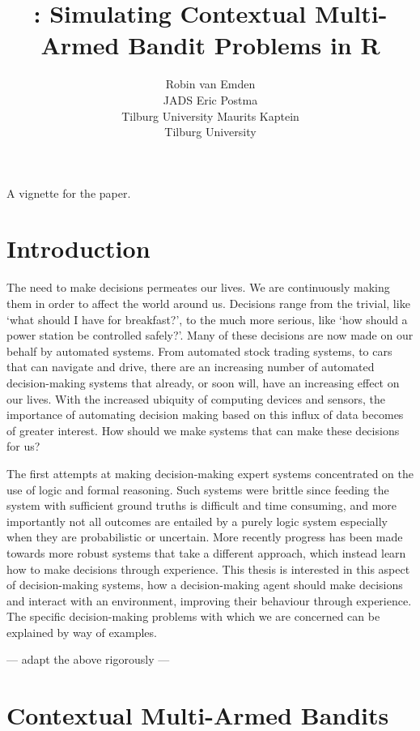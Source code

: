 \documentclass[nojss]{jss}
\author{Robin van Emden\\JADS \And
  Eric Postma\\Tilburg University \And
  Maurits Kaptein\\Tilburg University}
\title{\pkg{contextual}: Simulating Contextual Multi-Armed Bandit Problems in R}
\begin{document}
A vignette for the \cite{contextual} paper.


\section{Introduction}

The need to make decisions permeates our lives. We are continuously making them in order to affect the world around us. Decisions range from the trivial, like ‘what should I have for breakfast?’, to the much more serious, like ‘how should a power station be controlled safely?’. Many of these decisions are now made on our behalf by automated systems. From automated stock trading systems, to cars that can navigate and drive, there are an increasing number of automated decision-making systems that already, or soon will, have an increasing effect on our lives. With the increased ubiquity of computing devices and sensors, the importance of automating decision making based on this influx of data becomes of greater interest. How should we make systems that can make these decisions for us?

The first attempts at making decision-making expert systems concentrated on the use of logic and formal reasoning. Such systems were brittle since feeding the system with sufficient ground truths is difficult and time consuming, and more importantly not all outcomes are entailed by a purely logic system especially when they are probabilistic or uncertain. More recently progress has been made towards more robust systems that take a different approach, which instead learn how to make decisions through experience. This thesis is interested in this aspect of decision-making systems, how a decision-making agent should make decisions and interact with an environment, improving their behaviour through experience. The specific decision-making problems with which we are concerned can be explained by way of examples.

--- adapt the above rigorously ---

\section{Contextual Multi-Armed Bandits}
\end{document}
